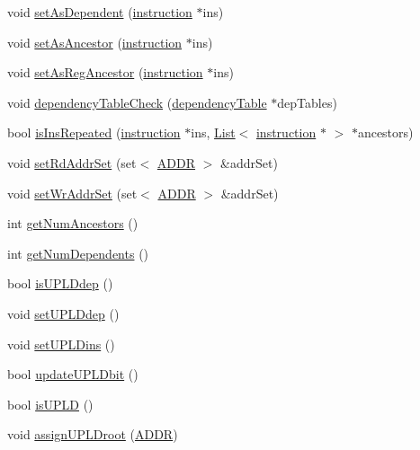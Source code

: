 \begin{DoxyCompactItemize}
void \hyperlink{classinstruction_ab2ba6828f1256186a787d933a6ca0868}{setAsDependent} (\hyperlink{classinstruction}{instruction} $\ast$ins)
\item 
void \hyperlink{classinstruction_aee7e55cf32812b46267a22bcb53da670}{setAsAncestor} (\hyperlink{classinstruction}{instruction} $\ast$ins)
\item 
void \hyperlink{classinstruction_ab89bab28eb321e32fddfb44354c8245f}{setAsRegAncestor} (\hyperlink{classinstruction}{instruction} $\ast$ins)
\item 
void \hyperlink{classinstruction_ab21a5713ecebfd1b6b6c8aeed06e4679}{dependencyTableCheck} (\hyperlink{classdependencyTable}{dependencyTable} $\ast$depTables)
\item 
bool \hyperlink{classinstruction_ab367eab50dc74c47b70de127fc633c9b}{isInsRepeated} (\hyperlink{classinstruction}{instruction} $\ast$ins, \hyperlink{classList}{List}$<$ \hyperlink{classinstruction}{instruction} $\ast$ $>$ $\ast$ancestors)
\item 
void \hyperlink{classinstruction_a379cbb0fb6bbe15168c6eac05a37114f}{setRdAddrSet} (set$<$ \hyperlink{binaryTranslator_2global_8h_a8bb6b77b3aab51e3a8d1866dd5861225}{ADDR} $>$ \&addrSet)
\item 
void \hyperlink{classinstruction_a8928d9fe638fd7307606fac71a31b681}{setWrAddrSet} (set$<$ \hyperlink{binaryTranslator_2global_8h_a8bb6b77b3aab51e3a8d1866dd5861225}{ADDR} $>$ \&addrSet)
\item 
int \hyperlink{classinstruction_a2e29e3536ad20c65b6c7b76ba6e37ad8}{getNumAncestors} ()
\item 
int \hyperlink{classinstruction_adb8073eb7167fc23a3c846db8129b068}{getNumDependents} ()
\item 
bool \hyperlink{classinstruction_a65493a2688efea847fc17e08df019af9}{isUPLDdep} ()
\item 
void \hyperlink{classinstruction_a9e341ec4d383ed7a70104164904651f2}{setUPLDdep} ()
\item 
void \hyperlink{classinstruction_adcf44cfcb7a8c267da71a1ef7b2f4b91}{setUPLDins} ()
\item 
bool \hyperlink{classinstruction_ab54ef1118b6422bd1f953b9244b64f10}{updateUPLDbit} ()
\item 
bool \hyperlink{classinstruction_a4e7c293557754da06684c7b04c4aaf5c}{isUPLD} ()
\item 
void \hyperlink{classinstruction_abce03a3d46f53f28cdeed1f77638e74f}{assignUPLDroot} (\hyperlink{binaryTranslator_2global_8h_a8bb6b77b3aab51e3a8d1866dd5861225}{ADDR})
\item 

\end{DoxyCompactItemize}
